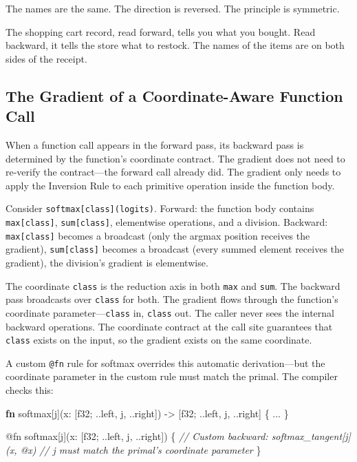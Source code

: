 \documentclass[11pt,titlepage]{article}
\newenvironment{Shaded}{}{}
\newcommand{\CommentTok}[1]{\textcolor[rgb]{0.38,0.63,0.69}{\textit{#1}}}
\newcommand{\DataTypeTok}[1]{\textcolor[rgb]{0.56,0.13,0.00}{#1}}
\newcommand{\KeywordTok}[1]{\textcolor[rgb]{0.00,0.44,0.13}{\textbf{#1}}}
\newcommand{\NormalTok}[1]{#1}
\newcommand{\OperatorTok}[1]{\textcolor[rgb]{0.40,0.40,0.40}{#1}}
\begin{document}
The names are the same. The direction is reversed. The principle is
symmetric.

The shopping cart record, read forward, tells you what you bought. Read
backward, it tells the store what to restock. The names of the items are
on both sides of the receipt.

\vspace{2em}

\hypertarget{the-gradient-of-a-coordinate-aware-function-call}{%
\subsection{The Gradient of a Coordinate-Aware Function
Call}\label{the-gradient-of-a-coordinate-aware-function-call}}

When a function call appears in the forward pass, its backward pass is
determined by the function's coordinate contract. The gradient does not
need to re-verify the contract---the forward call already did. The
gradient only needs to apply the Inversion Rule to each primitive
operation inside the function body.

Consider \texttt{softmax{[}class{]}(logits)}. Forward: the function body
contains \texttt{max{[}class{]}}, \texttt{sum{[}class{]}}, elementwise
operations, and a division. Backward: \texttt{max{[}class{]}} becomes a
broadcast (only the argmax position receives the gradient),
\texttt{sum{[}class{]}} becomes a broadcast (every summed element
receives the gradient), the division's gradient is elementwise.

The coordinate \texttt{class} is the reduction axis in both \texttt{max}
and \texttt{sum}. The backward pass broadcasts over \texttt{class} for
both. The gradient flows through the function's coordinate
parameter---\texttt{class} in, \texttt{class} out. The caller never sees
the internal backward operations. The coordinate contract at the call
site guarantees that \texttt{class} exists on the input, so the gradient
exists on the same coordinate.

A custom \texttt{@fn} rule for softmax overrides this automatic
derivation---but the coordinate parameter in the custom rule must match
the primal. The compiler checks this:

\begin{Shaded}
\begin{Highlighting}[]
\KeywordTok{fn}\NormalTok{ softmax[j](x: }\OperatorTok{[}\DataTypeTok{f32}\NormalTok{; ..left, j, ..right}\OperatorTok{]}\NormalTok{) -> }\OperatorTok{[}\DataTypeTok{f32}\NormalTok{; ..left, j, ..right}\OperatorTok{]} \OperatorTok{\{}\NormalTok{ ... }\OperatorTok{\}}

\NormalTok{@fn softmax}\OperatorTok{[}\NormalTok{j}\OperatorTok{]}\NormalTok{(x: }\OperatorTok{[}\DataTypeTok{f32}\NormalTok{; ..left, j, ..right}\OperatorTok{]}\NormalTok{) }\OperatorTok{\{}
    \CommentTok{// Custom backward: softmax_tangent[j](x, @x)}
    \CommentTok{// j must match the primal's coordinate parameter}
\OperatorTok{\}}
\end{Highlighting}
\end{Shaded}
\end{document}
